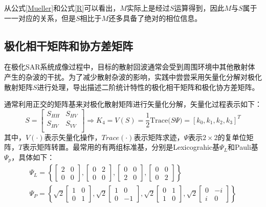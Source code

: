 从公式\eqref{Mueller}和公式\eqref{R}可以看出，$M$实际上是经过$S$运算得到，因此$M$与$S$属于一一对应的关系，但是$S$相比于$M$还多具备了绝对的相位信息。

\subsection{极化相干矩阵和协方差矩阵}
在极化SAR系统成像过程中，目标的散射回波通常会受到周围环境中其他散射体产生的杂波的干扰。为了减少散射杂波的影响，实践中尝尝采用矢量化分解对极化散射矩阵$S$进行处理，导出描述二阶统计特性的极化相干矩阵和极化协方差矩阵。

通常利用正交的矩阵基来对极化散射矩阵进行矢量化分解，矢量化过程表示如下：
\begin{equation}
    S=\left[ \begin{matrix}
            S_{HH} & S_{HV} \\
            S_{HV} & S_{VV} \\
        \end{matrix} \right] \Rightarrow K_4=V(S)=\frac{1}{2}\mathrm{Trace(}S\Psi )=\left[ k_0,k_1,k_2,k_3 \right] ^T
\end{equation}
其中，$V(\cdot)$表示矢量化操作，$Trace(\cdot)$表示矩阵求迹，$\Psi$表示$2\times2$的复单位矩阵，$T$表示矩阵转置。最常用的有两组标准基，分别是Lexicograhic基$\Psi_L$和Pauli基$\Psi_p$，具体如下：
\begin{gather}
    \Psi_L=\left\{\left[\begin{array}{ll}
            2 & 0 \\
            0 & 0
        \end{array}\right],\left[\begin{array}{ll}
            0 & 2 \\
            0 & 0
        \end{array}\right],\left[\begin{array}{ll}
            0 & 0 \\
            2 & 0
        \end{array}\right],\left[\begin{array}{ll}
            0 & 0 \\
            0 & 2
        \end{array}\right]\right\}                                    \\
    \Psi_P=\left\{\sqrt{2}\left[\begin{array}{ll}
            1 & 0 \\
            0 & 1
        \end{array}\right], \sqrt{2}\left[\begin{array}{cc}
            1 & 0  \\
            0 & -1
        \end{array}\right], \sqrt{2}\left[\begin{array}{ll}
            0 & 1 \\
            1 & 0
        \end{array}\right], \sqrt{2}\left[\begin{array}{cc}
            0 & -i \\
            i & 0
        \end{array}\right]\right\}
\end{gather}

